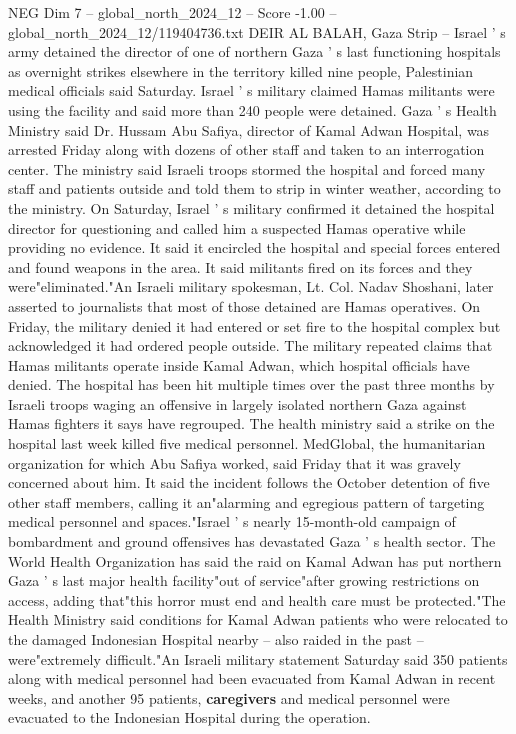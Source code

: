 \begin{textsample}{NEG Dim 7 – global\_north\_2024\_12 – Score -1.00 – global\_north\_2024\_12/119404736.txt}  \label{ex:f7_neg_167}
DEIR AL BALAH, Gaza Strip -- Israel ' s army detained the director of one of northern Gaza ' s last functioning hospitals as overnight strikes elsewhere in the territory killed nine people, Palestinian medical officials said Saturday.
Israel ' s military claimed Hamas militants were using the facility and said more than 240 people were detained.
Gaza ' s Health Ministry said Dr.
Hussam Abu Safiya, director of Kamal Adwan Hospital, was arrested Friday along with dozens of other staff and taken to an interrogation center.
The ministry said Israeli troops stormed the hospital and forced many staff and patients outside and told them to strip in winter weather, according to the ministry.
On Saturday, Israel ' s military confirmed it detained the hospital director for questioning and called him a suspected Hamas operative while providing no evidence.
It said it encircled the hospital and special forces entered and found weapons in the area.
It said militants fired on its forces and they were"eliminated."An Israeli military spokesman, Lt.
Col.
Nadav Shoshani, later asserted to journalists that most of those detained are Hamas operatives.
On Friday, the military denied it had entered or set fire to the hospital complex but acknowledged it had ordered people outside.
The military repeated claims that Hamas militants operate inside Kamal Adwan, which hospital officials have denied.
The hospital has been hit multiple times over the past three months by Israeli troops waging an offensive in largely isolated northern Gaza against Hamas fighters it says have regrouped.
The health ministry said a strike on the hospital last week killed five medical personnel.
MedGlobal, the humanitarian organization for which Abu Safiya worked, said Friday that it was gravely concerned about him.
It said the incident follows the October detention of five other staff members, calling it an"alarming and egregious pattern of targeting medical personnel and spaces."Israel ' s nearly 15-month-old campaign of bombardment and ground offensives has devastated Gaza ' s health sector.
The World Health Organization has said the raid on Kamal Adwan has put northern Gaza ' s last major health facility"out of service"after growing restrictions on access, adding that"this horror must end and health care must be protected."The Health Ministry said conditions for Kamal Adwan patients who were relocated to the damaged Indonesian Hospital nearby -- also raided in the past -- were"extremely difficult."An Israeli military statement Saturday said 350 patients along with medical personnel had been evacuated from Kamal Adwan in recent weeks, and another 95 patients, \textbf{caregivers} and medical personnel were evacuated to the Indonesian Hospital during the operation.

\end{textsample}
